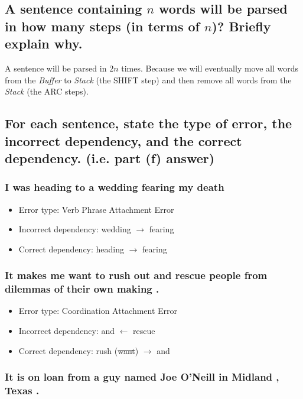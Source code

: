 \documentclass[12pt, letterpaper]{article}
\begin{document}
\subsection{A sentence containing $n$ words will be parsed in how many steps (in terms of $n$)? Briefly explain why.}

A sentence will be parsed in $2 n$ times. Because we will eventually move all words from the \textit{Buffer} to \textit{Stack} (the SHIFT step) and then remove all words from the \textit{Stack} (the ARC steps).

\subsection{For each sentence, state the type of error, the incorrect dependency, and the correct dependency. (i.e. part \textbf{(f)} answer)}

\subsubsection{I was heading to a wedding fearing my death}

\begin{itemize}
  \item Error type: Verb Phrase Attachment Error
  \item Incorrect dependency: wedding $\rightarrow$ fearing
  \item Correct dependency: heading $\rightarrow$ fearing
\end{itemize}

\subsubsection{It makes me want to rush out and rescue people from dilemmas of their own making .}

\begin{itemize}
  \item Error type: Coordination Attachment Error
  \item Incorrect dependency: and $\leftarrow$ rescue
  \item Correct dependency: rush (\sout{want}) $\rightarrow$ and
\end{itemize}

\subsubsection{It is on loan from a guy named Joe O'Neill in Midland , Texas .}
\end{document}
